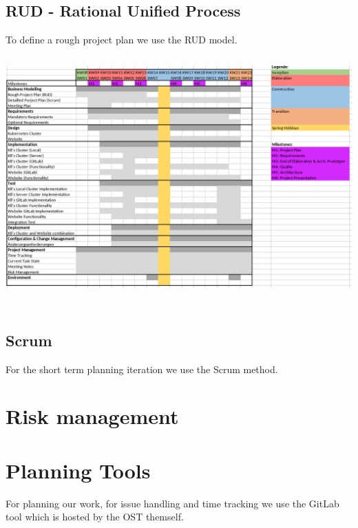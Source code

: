 \subsection{RUD - Rational Unified Process}
To define a rough project plan we use the RUD model. \newline
\includegraphics[height=10cm]{resources/project-plan-RUD.png}

\subsection{Scrum}
For the short term planning iteration we use the Scrum method.

\section{Risk management}


\section{Planning Tools}
For planning our work, for issue handling and time tracking we use the GitLab tool which is hosted by the OST themself.